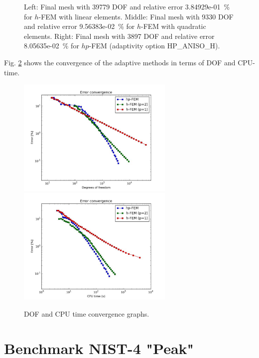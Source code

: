 \documentclass[12pt]{elsarticle}
\begin{document}
\begin{figure}[!ht]
\caption{
Left: Final mesh with 39779 DOF and relative error 3.84929e-01~\% for $h$-FEM with linear elements.
Middle: Final mesh with 9330 DOF and relative error 9.56383e-02~\% for $h$-FEM with quadratic elements.
Right: Final mesh with 3897 DOF and relative error 8.05635e-02~\% for $hp$-FEM (adaptivity option HP\_ANISO\_H).}
\label{fig:nist-3-hp-aniso}
\end{figure}

Fig. \ref{fig:nist-3-conv} shows the convergence of the adaptive methods in terms of DOF and CPU-time.

\begin{figure}[H]
\centering
\hspace{-50mm}
\includegraphics[width=7.5cm]{mafig21.pdf}\ \
\hspace{-10mm}
\includegraphics[width=7.5cm]{mafig22.pdf}
\hspace{-50mm}
\vspace{-2mm}
\caption{DOF and CPU time convergence graphs.}
\label{fig:nist-3-conv}
\end{figure}


\section{Benchmark NIST-4 "Peak"}
\label{sec:bench-4}
\end{document}
